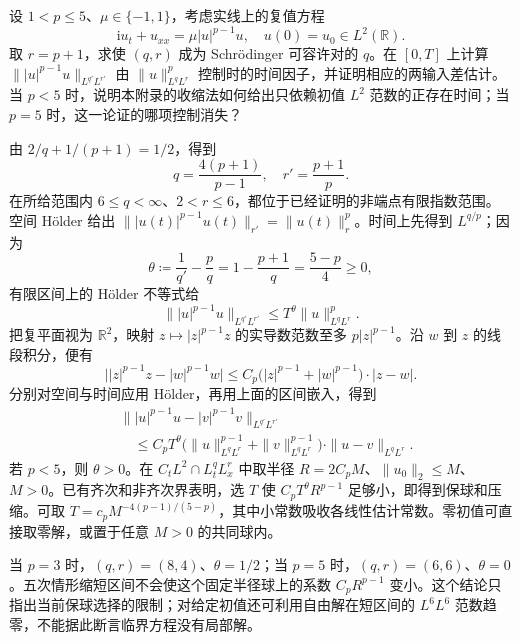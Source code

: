 \begin{exercise}\label{b2:ex:app-E-5}
设 \(1<p\leq5\)、\(\mu\in\{-1,1\}\)，考虑实线上的复值方程
\[
 \mathrm i u_t+u_{xx}=\mu|u|^{p-1}u,\quad u(0)=u_0\in L^2(\mathbb R).
\]
取 \(r=p+1\)，求使 \((q,r)\) 成为 Schrödinger 可容许对的 \(q\)。在 \([0,T]\) 上计算
\(\||u|^{p-1}u\|_{L^{q'}L^{r'}}\) 由 \(\|u\|_{L^qL^r}^p\) 控制时的时间因子，并证明相应的两输入差估计。当 \(p<5\) 时，说明本附录的收缩法如何给出只依赖初值 \(L^2\) 范数的正存在时间；当 \(p=5\) 时，这一论证的哪项控制消失？
\end{exercise}
\begin{solution}
由 \(2/q+1/(p+1)=1/2\)，得到
\[
 q=\frac{4(p+1)}{p-1},\quad r'=\frac{p+1}{p}.
\]
在所给范围内 \(6\leq q<\infty\)、\(2<r\leq6\)，都位于已经证明的非端点有限指数范围。空间 Hölder 给出
\(\||u(t)|^{p-1}u(t)\|_{r'}=\|u(t)\|_r^p\)。时间上先得到 \(L^{q/p}\)；因为
\[
 \theta\coloneqq\frac1{q'}-\frac pq
 =1-\frac{p+1}{q}=\frac{5-p}{4}\geq0,
\]
有限区间上的 Hölder 不等式给
\[
 \||u|^{p-1}u\|_{L^{q'}L^{r'}}
 \leq T^\theta\|u\|_{L^qL^r}^p.
\]
把复平面视为 \(\mathbb R^2\)，映射 \(z\mapsto|z|^{p-1}z\) 的实导数范数至多 \(p|z|^{p-1}\)。沿 \(w\) 到 \(z\) 的线段积分，便有
\[
 \bigl||z|^{p-1}z-|w|^{p-1}w\bigr|
 \leq C_p\bigl(|z|^{p-1}+|w|^{p-1}\bigr)\cdot|z-w|.
\]
分别对空间与时间应用 Hölder，再用上面的区间嵌入，得到
\[
 \begin{aligned}
 &\bigl\||u|^{p-1}u-|v|^{p-1}v\bigr\|_{L^{q'}L^{r'}}\\
 &\quad\leq C_p T^\theta
   \bigl(\|u\|_{L^qL^r}^{p-1}+\|v\|_{L^qL^r}^{p-1}\bigr)
   \cdot\|u-v\|_{L^qL^r}.
 \end{aligned}
\]
若 \(p<5\)，则 \(\theta>0\)。在 \(C_tL^2\cap L^q_tL^r_x\) 中取半径 \(R=2C_pM\)、\(\|u_0\|_2\leq M\)、\(M>0\)。已有齐次和非齐次界表明，选 \(T\) 使 \(C_pT^\theta R^{p-1}\) 足够小，即得到保球和压缩。可取 \(T=c_p M^{-4(p-1)/(5-p)}\)，其中小常数吸收各线性估计常数。零初值可直接取零解，或置于任意 \(M>0\) 的共同球内。

当 \(p=3\) 时，\((q,r)=(8,4)\)、\(\theta=1/2\)；当 \(p=5\) 时，\((q,r)=(6,6)\)、\(\theta=0\)。五次情形缩短区间不会使这个固定半径球上的系数 \(C_pR^{p-1}\) 变小。这个结论只指出当前保球选择的限制；对给定初值还可利用自由解在短区间的 \(L^6L^6\) 范数趋零，不能据此断言临界方程没有局部解。
\end{solution}

